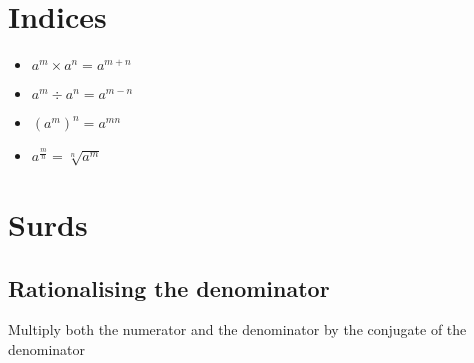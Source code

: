\section{Indices}
\begin{itemize}
    \item $a^m \times a^n = a^{m+n}$
    \item $a^m \div a^n = a^{m-n}$
    \item $(a^m)^n = a^{mn}$
    \item $a^{\frac{m}{n}} = \sqrt[n]{a^m}$
\end{itemize}

\section{Surds}
\subsection{Rationalising the denominator}
Multiply both the numerator and the denominator by the conjugate of the denominator